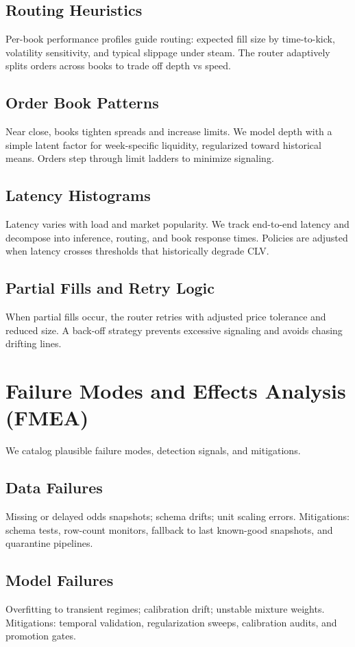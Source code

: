 \subsection{Routing Heuristics}
Per-book performance profiles guide routing: expected fill size by time-to-kick, volatility sensitivity, and typical slippage under steam. The router adaptively splits orders across books to trade off depth vs speed.

\subsection{Order Book Patterns}
Near close, books tighten spreads and increase limits. We model depth with a simple latent factor for week-specific liquidity, regularized toward historical means. Orders step through limit ladders to minimize signaling.

\subsection{Latency Histograms}
Latency varies with load and market popularity. We track end-to-end latency and decompose into inference, routing, and book response times. Policies are adjusted when latency crosses thresholds that historically degrade CLV.

\subsection{Partial Fills and Retry Logic}
When partial fills occur, the router retries with adjusted price tolerance and reduced size. A back-off strategy prevents excessive signaling and avoids chasing drifting lines.

\section{Failure Modes and Effects Analysis (FMEA)}\label{app:fmea}
We catalog plausible failure modes, detection signals, and mitigations.

\subsection{Data Failures}
Missing or delayed odds snapshots; schema drifts; unit scaling errors. Mitigations: schema tests, row-count monitors, fallback to last known-good snapshots, and quarantine pipelines.

\subsection{Model Failures}
Overfitting to transient regimes; calibration drift; unstable mixture weights. Mitigations: temporal validation, regularization sweeps, calibration audits, and promotion gates.

